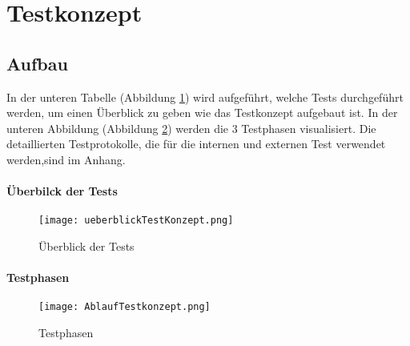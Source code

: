 \section{Testkonzept}\label{sec:testkonzept}

\subsection{Aufbau} \label{subsec:prinzip}

In der unteren Tabelle (Abbildung \ref{fig:überblick}) wird aufgeführt, welche Tests durchgeführt werden, um einen Überblick zu geben wie das Testkonzept aufgebaut ist. In der unteren Abbildung  (Abbildung \ref{fig:phasen}) werden die 3 Testphasen visualisiert. Die detaillierten Testprotokolle, die für die internen und externen Test verwendet werden,sind im Anhang.  

\paragraph{Überbilck der Tests}
\begin{figure}[H]
	\centering
	\texttt{[image: ueberblickTestKonzept.png]}
	\caption{Überblick der Tests}
	\label{fig:überblick}
\end{figure}

\paragraph{Testphasen}
\begin{figure}[H]
	\centering
	\texttt{[image: AblaufTestkonzept.png]}
	\caption{Testphasen}
	\label{fig:phasen}
\end{figure}



\newpage
